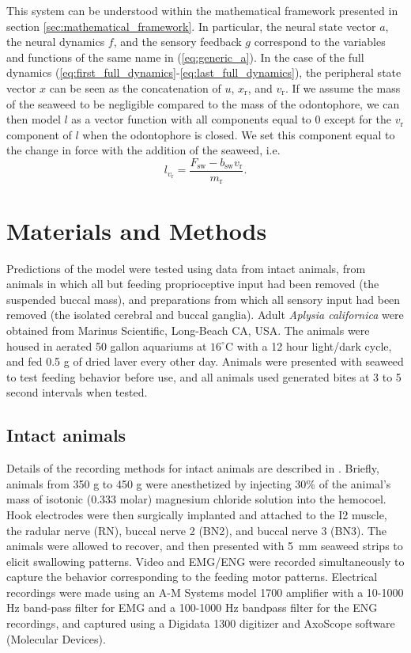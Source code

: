 This system can be understood within the mathematical framework presented in
section \ref{sec:mathematical_framework}.  In particular, the neural state
vector $a$, the neural dynamics $f$, and the sensory feedback $g$ correspond
to the variables and functions of the same name in (\ref{eq:generic_a}).  In
the case of the full dynamics
(\ref{eq:first_full_dynamics}-\ref{eq:last_full_dynamics}), the peripheral
state vector $x$ can be seen as the concatenation of $u$, $x_\textrm{r}$, and $v_\textrm{r}$.
If we assume the mass of the seaweed to be negligible compared to the mass
of the odontophore, we can then model $l$ as a vector function with all
components equal to $0$ except for the $v_\textrm{r}$ component of $l$ when the
odontophore is closed.  We set this component equal to the change in force with
the addition of the seaweed, i.e.
\begin{equation}
    l_{v_\textrm{r}} = \frac{F_\textrm{sw} - b_\textrm{sw} v_\textrm{r}}{m_\textrm{r}}.
\end{equation}

\section{Materials and Methods}
Predictions of the model were tested using data from intact animals, from
animals in which all but feeding proprioceptive input had been removed (the
suspended buccal mass), and preparations from which all sensory input had been
removed (the isolated cerebral and buccal ganglia).
Adult \textit{Aplysia californica} were obtained from Marinus Scientific,
Long-Beach CA, USA.  The animals were housed in aerated 50 gallon aquariums at
$16^\circ$C with a 12 hour light/dark cycle, and fed 0.5 g of dried laver every
other day.  Animals were presented with seaweed to test feeding behavior before
use, and all animals used generated bites at 3 to 5 second intervals when tested.

\subsection{Intact animals}
Details of the recording methods for intact animals are described in
\citet{cullins_electrode_2010}.  Briefly, animals from 350 g to 450 g were
anesthetized by injecting 30\% of the animal's mass of isotonic (0.333 molar)
magnesium chloride solution into the hemocoel.  Hook electrodes were
then surgically implanted and attached to the I2 muscle, the radular nerve
(RN), buccal nerve 2 (BN2), and buccal nerve 3 (BN3).  The animals were allowed
to recover, and then presented with 5~mm seaweed strips to elicit swallowing
patterns.  Video and EMG/ENG were recorded simultaneously to capture the
behavior corresponding to the feeding motor patterns.  Electrical recordings
were made using an A-M Systems model 1700 amplifier with a 10-1000 Hz band-pass
filter for EMG and a 100-1000 Hz bandpass filter for the ENG recordings, and
captured using a Digidata 1300 digitizer and AxoScope software (Molecular Devices).

